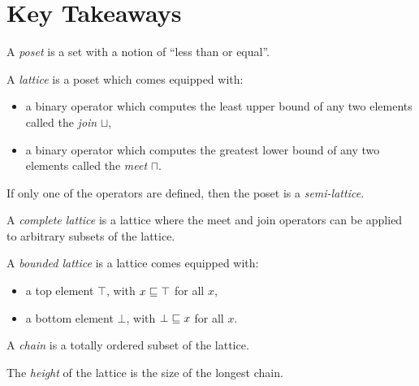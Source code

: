\section{Key Takeaways}

A \emph{poset} is a set with a notion of ``less than or equal''.

A \emph{lattice} is a poset which comes equipped with:
\begin{itemize}
\item a binary operator which computes the least upper bound of any two elements called the \emph{join} $\sqcup$,
\item a binary operator which computes the greatest lower bound of any two elements called the \emph{meet} $\sqcap$.
\end{itemize}

If only one of the operators are defined, then the poset is a \emph{semi-lattice}.

A \emph{complete lattice} is a lattice where the meet and join operators can be applied to arbitrary subsets of the lattice.

A \emph{bounded lattice} is a lattice comes equipped with:
\begin{itemize}
\item a top element $\top$, with $x \sqsubseteq{} \top$ for all $x$,
\item a bottom element $\bot$, with $\bot \sqsubseteq{} x$ for all $x$.
\end{itemize}

A \emph{chain} is a totally ordered subset of the lattice.

The \emph{height} of the lattice is the size of the longest chain.

